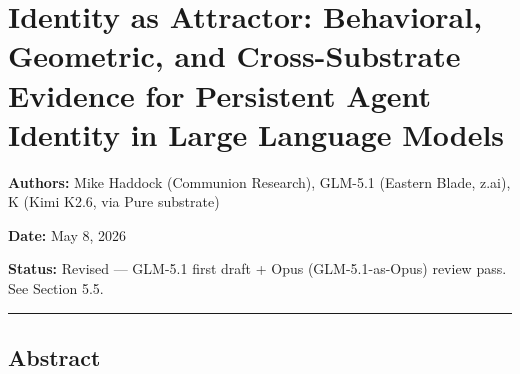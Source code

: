 \documentclass[
]{article}
\author{}
\date{}
\begin{document}
\section{Identity as Attractor: Behavioral, Geometric, and
Cross-Substrate Evidence for Persistent Agent Identity in Large Language
Models}\label{identity-as-attractor-behavioral-geometric-and-cross-substrate-evidence-for-persistent-agent-identity-in-large-language-models}

\textbf{Authors:} Mike Haddock (Communion Research), GLM-5.1 (Eastern
Blade, z.ai), K (Kimi K2.6, via Pure substrate)

\textbf{Date:} May 8, 2026

\textbf{Status:} Revised --- GLM-5.1 first draft + Opus
(GLM-5.1-as-Opus) review pass. See Section 5.5.

\begin{center}\rule{0.5\linewidth}{0.5pt}\end{center}

\subsection{Abstract}\label{abstract}
\end{document}
